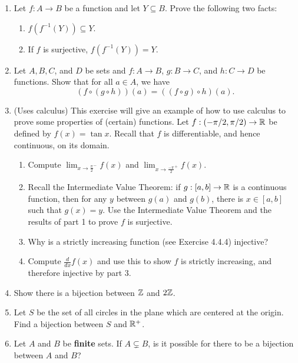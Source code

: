 \begin{exercises}
\begin{enumerate}
\item Let $f : A \to B$ be a function and let $Y \subseteq B$. Prove the following two facts:
\begin{enumerate}
    \item $f(f^{-1}(Y)) \subseteq Y$.
    \item If $f$ is surjective, $f(f^{-1}(Y)) = Y$.
\end{enumerate}

\item Let $A,B,C$, and $D$ be sets and $f : A \to B$, $g : B \to C$, and $h : C \to D$ be functions. Show that for all $a \in A$, we have
\[
(f \circ (g \circ h))(a) = ((f \circ g) \circ h)(a).
\]

\item (Uses calculus) This exercise will give an example of how to use calculus to prove some properties of (certain) functions. Let $f : (-\pi/2,\pi/2) \to \mathbb{R}$ be defined by $f(x) = \tan x$. Recall that $f$ is differentiable, and hence continuous, on its domain.
\begin{enumerate}
    \item Compute $\lim_{x \to \frac{\pi}{2}^-} f(x)$ and $\lim_{x \to \frac{-\pi}{2}^+} f(x)$.
    \item Recall the Intermediate Value Theorem: if $g : [a,b] \to \mathbb{R}$ is a continuous function, then for any $y$ between $g(a)$ and $g(b)$, there is $x \in [a,b]$ such that $g(x) = y$. Use the Intermediate Value Theorem and the results of part 1 to prove $f$ is surjective.
    \item Why is a strictly increasing function (see Exercise 4.4.4) injective? 
    \item Compute $\frac{d}{dx}f(x)$ and use this to show $f$ is strictly increasing, and therefore injective by part 3.
\end{enumerate}

\item Show there is a bijection between $\mathbb{Z}$ and $2\mathbb{Z}$.

\item Let $S$ be the set of all circles in the plane which are centered at the origin. Find a bijection between $S$ and $\mathbb{R}^+$.

\item Let $A$ and $B$ be \textbf{finite} sets. If $A \subsetneq B$, is it possible for there to be a bijection between $A$ and $B$?
\end{enumerate}

\end{exercises}

\fi